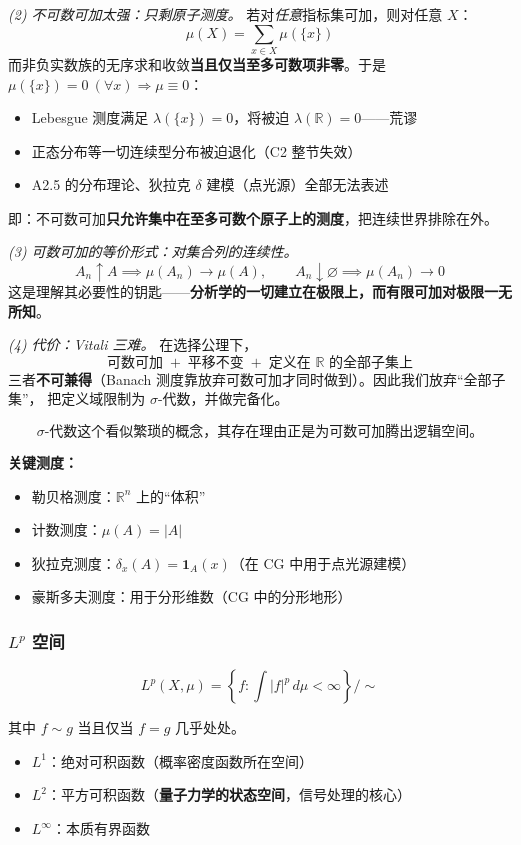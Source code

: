 \textit{(2) 不可数可加太强：只剩原子测度。} 若对\emph{任意}指标集可加，则对任意 $X$：
\[
\mu(X) = \sum_{x\in X}\mu(\{x\})
\]
而非负实数族的无序求和收敛\textbf{当且仅当至多可数项非零}。于是 $\mu(\{x\})=0\ (\forall x) \Rightarrow \mu \equiv 0$：
\begin{itemize}
  \item Lebesgue 测度满足 $\lambda(\{x\})=0$，将被迫 $\lambda(\mathbb{R})=0$——荒谬
  \item 正态分布等一切连续型分布被迫退化（C2 整节失效）
  \item A2.5 的分布理论、狄拉克 $\delta$ 建模（点光源）全部无法表述
\end{itemize}
即：不可数可加\textbf{只允许集中在至多可数个原子上的测度}，把连续世界排除在外。

\textit{(3) 可数可加的等价形式：对集合列的连续性。}
\[
A_n \uparrow A \implies \mu(A_n)\to\mu(A), \qquad
A_n \downarrow \varnothing \implies \mu(A_n)\to 0
\]
这是理解其必要性的钥匙——\textbf{分析学的一切建立在极限上，而有限可加对极限一无所知}。

\textit{(4) 代价：Vitali 三难。} 在选择公理下，
\[
\text{可数可加} \;+\; \text{平移不变} \;+\; \text{定义在 }\mathbb{R}\text{ 的全部子集上}
\]
三者\textbf{不可兼得}（Banach 测度靠放弃可数可加才同时做到）。因此我们放弃“全部子集”，
把定义域限制为 $\sigma$-代数，并做完备化。

\[
\boxed{\text{$\sigma$-代数这个看似繁琐的概念，其存在理由正是为可数可加腾出逻辑空间。}}
\]

\textbf{关键测度：}
\begin{itemize}
  \item 勒贝格测度：$\mathbb{R}^n$ 上的“体积”
  \item 计数测度：$\mu(A) = |A|$
  \item 狄拉克测度：$\delta_x(A) = \mathbf{1}_A(x)$（在 CG 中用于点光源建模）
  \item 豪斯多夫测度：用于分形维数（CG 中的分形地形）
\end{itemize}

\subsubsection{$L^p$ 空间}

\[
L^p(X, \mu) = \left\{f : \int |f|^p\,d\mu < \infty\right\} / \sim
\]

其中 $f \sim g$ 当且仅当 $f = g$ 几乎处处。

\begin{itemize}
  \item $L^1$：绝对可积函数（概率密度函数所在空间）
  \item $L^2$：平方可积函数（\textbf{量子力学的状态空间}，信号处理的核心）
  \item $L^\infty$：本质有界函数
\end{itemize}

